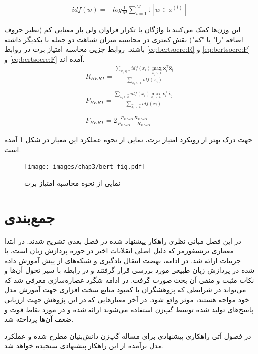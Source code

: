 \begin{align} \label{eq:idf}
idf(w) = -log \frac{1}{M} \sum_{i=1}^{M} \mathbb{I}[w \in x^{(i)}]
\end{align}

 این وزن‌ها کمک می‌کنند تا واژگان با تکرار فراوان ولی بار معنایی کم (نظیر حروف اضافه "را" یا "که") نقش کمتری در محاسبه میزان شباهت دو جمله با یکدیگر داشته باشند. روابط جزیی محاسبه امتیاز برت در روابط 
\ref{eq:bertsocre:R}
و
\ref{eq:bertsocre:P}
و
\ref{eq:bertsocre:F}
آمده اند.
\begin{align}\label{eq:bertsocre:R}
R_{BERT} = \frac{
\sum_{x_i \in x}^{} idf(x_i) \max_{\hat{x}_j \in \hat{x} } \mathbf{x}_i^\intercal \mathbf{\hat{x}}_j
}
{\sum_{x_i \in x}^{} idf(x_i) } \\ \nonumber \\ \label{eq:bertsocre:P} 
P_{BERT} = \frac{
	\sum_{x_i \in \hat{x}}^{} idf(x_i) \max_{x_j \in x } \mathbf{x}_i^\intercal \mathbf{\hat{x}}_j
}
{\sum_{\hat{x}_i \in \hat{x}}^{} idf(x_i) } \\ \nonumber \\ \label{eq:bertsocre:F} 
F_{BERT} = 2 \frac{P_{BERT} \dot{R_{BERT}}}{P_{BERT}+R_{BERT}}
\end{align}

جهت درک بهتر از رویکرد امتیاز برت، نمایی از نحوه عملکرد این معیار در شکل 
\ref{fig:chap3:bertscore}
آمده است.

 \begin{figure}[h]
	\centering
	\texttt{[image: images/chap3/bert\_fig.pdf]}
	\caption[نمایی از نحوه محاسبه امتیاز برت]
	{
		نمایی از نحوه محاسبه امتیاز برت
		\cite{bertscore_paper}
	}
	\label{fig:chap3:bertscore}
\end{figure}

\section{جمع‌بندی}
در این فصل مبانی نظری راهکار پیشنهاد شده در فصل بعدی تشریح شدند. در ابتدا معماری ترنسفورمر که دلیل اصلی انقلابات اخیر در حوزه پردازش زبان است، با جزییات ارائه شد. در ادامه، نهضت انتقال یادگیری و شبکه‌های از پیش آموزش داده شده در پردازش زبان طبیعی مورد بررسی قرار گرفتند و در رابطه با سیر تحول آن‌ها و نکات مثبت و منفی آن بحث صورت گرفت. در ادامه شگرد عصاره‌سازی معرفی شد که می‌تواند در شرایطی که پژوهشگران با کمبود منابع سخت افزاری جهت آموزش مدل خود مواجه هستند، موثر واقع شود. در آخر معیارهایی که در این پژوهش جهت ارزیابی پاسخ‌های تولید شده توسط گپ‌زن استفاده می‌شوند ارائه شده و در مورد نقاط قوت و ضعف آن‌ها پرداخته شد.

در فصول آتی راهکاری پیشنهادی برای مساله گپ‌زن دانش‌بنیان مطرح شده و عملکرد مدل برآمده از این راهکار پیشنهادی سنجیده خواهد شد.